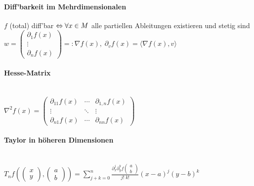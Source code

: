 \documentclass[paper=a3,paper=landscape, fontsize=9pt, DIV=30]{scrartcl}
\begin{document}
\begin{multicols*}{4}
 \paragraph{Diff'barkeit im Mehrdimensionalen}
 $f$ (total) diff'bar $\Leftrightarrow\\\forall x \in M$ alle partiellen Ableitungen existieren und stetig sind\\
 $w=\begin{pmatrix}
 \partial_1f(x)\\\vdots \\ \partial_nf(x)
 \end{pmatrix} =: \nabla f(x),\; \partial_vf(x)=\langle \nabla f(x), v \rangle$

 \paragraph{Hesse-Matrix}\hspace{0pt}\\
  $ \nabla^2f(x) = \begin{pmatrix}
  \partial_{11}f(x)  & \cdots & \partial_{1,n}f(x) \\
  \vdots  & \ddots & \vdots  \\
  \partial_{n1}f(x) & \cdots & \partial_{nn}f(x)
 \end{pmatrix}$

 \paragraph{Taylor in höheren Dimensionen}\hspace{0pt}\\
 $T_nf((\begin{smallmatrix} x\\y \end{smallmatrix}), (\begin{smallmatrix} a\\b \end{smallmatrix})) = \sum_{j+k=0}^{n} \frac{\partial_x^j\partial_y^kf(\begin{smallmatrix} a\\b \end{smallmatrix})}{j! \; k!} (x-a)^j(y-b)^k$


\end{multicols*}
\end{document}
